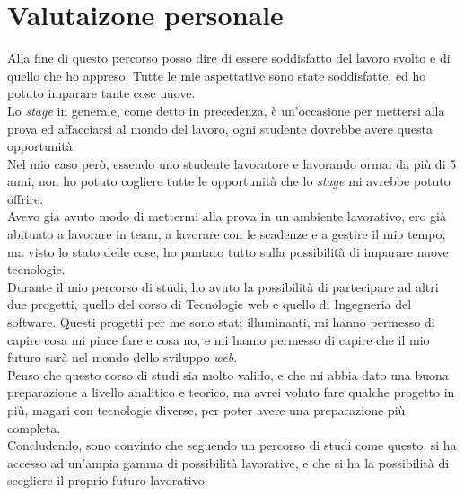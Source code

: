 \section{Valutaizone personale}
Alla fine di questo percorso posso dire di essere soddisfatto del lavoro svolto e di quello che ho appreso.
Tutte le mie aspettative sono state soddisfatte, ed ho potuto imparare tante cose nuove.\\
Lo \textit{stage} in generale, come detto in precedenza, è un'occasione per mettersi alla prova ed affacciarsi al mondo del lavoro,
ogni studente dovrebbe avere questa opportunità.\\
Nel mio caso però, essendo uno studente lavoratore e lavorando ormai da più di 5 anni, non ho potuto cogliere tutte 
le opportunità che lo \textit{stage} mi avrebbe potuto offrire.\\
Avevo gia avuto modo di mettermi alla prova in un ambiente lavorativo, ero già abituato a lavorare in team, a lavorare
con le scadenze e a gestire il mio tempo, ma visto lo stato delle cose, 
ho puntato tutto sulla possibilità di imparare nuove tecnologie.\\
Durante il mio percorso di studi, ho avuto la possibilità di partecipare ad altri due progetti, quello del corso di 
Tecnologie web e quello di Ingegneria del software. Questi progetti per me sono stati illuminanti, mi hanno
permesso di capire cosa mi piace fare e cosa no, e mi hanno permesso di capire che il mio futuro sarà nel mondo dello sviluppo \textit{web}.\\
Penso che questo corso di studi sia molto valido, e che mi abbia dato una buona preparazione a livello analitico e teorico, ma
avrei voluto fare qualche progetto in più, magari con tecnologie diverse, per poter avere una preparazione più completa.\\
Concludendo, sono convinto che seguendo un percorso di studi come questo, si ha accesso ad un'ampia gamma di possibilità lavorative,
e che si ha la possibilità di scegliere il proprio futuro lavorativo.